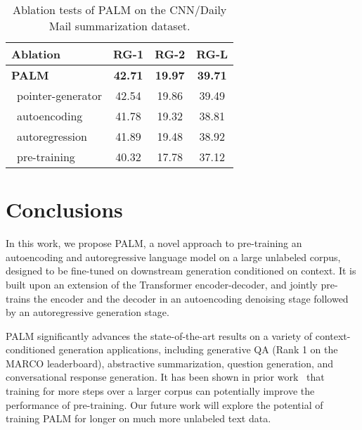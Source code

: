 \documentclass[11pt,a4paper]{article}
\newcommand{\method}{PALM\xspace}
\newcommand{\xmark}{\ding{55}}
\begin{document}
\begin{table}[t]
\center
\begin{tabular}{ l | c | c | c}
\hline\hline
{\textbf{Ablation}} & \textbf{RG-1} & \textbf{RG-2} & \textbf{RG-L}\\
\hline\hline
\textbf{\method} & \textbf{42.71} & \textbf{19.97} & \textbf{39.71} \\
\hline
\xmark\ pointer-generator & 42.54 & 19.86 & 39.49 \\
\hline
\xmark\ autoencoding & 41.78 & 19.32 & 38.81 \\
\hline
\xmark\ autoregression & 41.89 & 19.48 & 38.92 \\
\hline
\xmark\ pre-training & 40.32 & 17.78 & 37.12 \\
\hline\hline
\end{tabular}
\caption{Ablation tests of \method on the CNN/Daily Mail summarization dataset.}
\label{table:ablation}
\vspace{-8pt}
\end{table}

\section{Conclusions}
\vspace{-5pt}
In this work, we propose \method, a novel approach to pre-training an autoencoding and autoregressive language model on a large unlabeled corpus, designed to be fine-tuned on downstream generation conditioned on context. It is built upon an extension of the Transformer encoder-decoder, and jointly pre-trains the encoder and the decoder in an autoencoding denoising stage followed by an autoregressive generation stage.

\method significantly advances the state-of-the-art results on a variety of context-conditioned generation applications, including generative QA (Rank 1 on the MARCO leaderboard), abstractive summarization, question generation, and conversational response generation. It has been shown in prior work~\cite{roberta2019} that training for more steps over a larger corpus can potentially improve the performance of pre-training. Our future work will explore the potential of training \method for longer on much more unlabeled text data.



\end{document}
